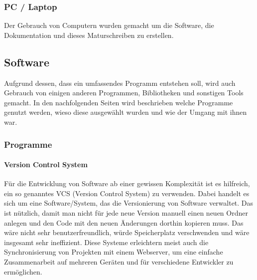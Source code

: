 \documentclass[a4paper,11pt]{article}
\begin{document}
\subsubsection{PC / Laptop}

Der Gebrauch von Computern wurden gemacht um die Software, die Dokumentation und dieses Maturschreiben zu erstellen. 
\subsection{Software}

Aufgrund dessen, dass ein umfassendes Programm entstehen soll, wird auch Gebrauch von einigen anderen Programmen, Bibliotheken und sonstigen Tools gemacht. In den nachfolgenden Seiten wird beschrieben welche Programme genutzt werden, wieso diese ausgewählt wurden und wie der Umgang mit ihnen war.  


\subsubsection{Programme}

\paragraph{Version Control System}

Für die Entwicklung von Software ab einer gewissen Komplexität ist es hilfreich, ein so genanntes VCS (Version Control System) zu verwenden. Dabei handelt es sich um eine Software/System, das die Versionierung von Software verwaltet. Das ist nützlich, damit man nicht für jede neue Version manuell einen neuen Ordner anlegen und den Code mit den neuen Änderungen dorthin kopieren muss. Das wäre nicht sehr benutzerfreundlich, würde Speicherplatz verschwenden und wäre insgesamt sehr ineffizient. Diese Systeme erleichtern meist auch die Synchronisierung von Projekten mit einem Webserver, um eine einfache Zusammenarbeit auf mehreren Geräten und für verschiedene Entwickler zu ermöglichen.\\
\end{document}
